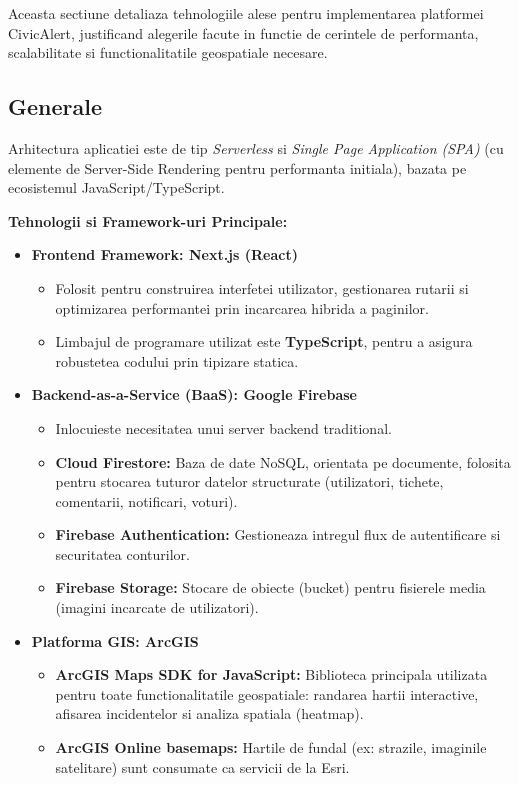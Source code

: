 \documentclass[12pt, a4paper]{article}
\begin{document}
Aceasta sectiune detaliaza tehnologiile alese  pentru implementarea platformei CivicAlert, justificand alegerile facute in functie de cerintele de performanta, scalabilitate si functionalitatile geospatiale necesare.

\subsection{Generale}
Arhitectura aplicatiei este de tip \textit{Serverless} si \textit{Single Page Application (SPA)} (cu elemente de Server-Side Rendering pentru performanta initiala), bazata pe ecosistemul JavaScript/TypeScript.

\textbf{Tehnologii si Framework-uri Principale:}
\begin{itemize}
    \item \textbf{Frontend Framework: Next.js (React)}
        \begin{itemize}
            \item Folosit pentru construirea interfetei utilizator, gestionarea rutarii si optimizarea performantei prin incarcarea hibrida a paginilor.
            \item Limbajul de programare utilizat este \textbf{TypeScript}, pentru a asigura robustetea codului prin tipizare statica.
        \end{itemize}
    \item \textbf{Backend-as-a-Service (BaaS): Google Firebase}
        \begin{itemize}
            \item Inlocuieste necesitatea unui server backend traditional.
            \item \textbf{Cloud Firestore:} Baza de date NoSQL, orientata pe documente, folosita pentru stocarea tuturor datelor structurate (utilizatori, tichete, comentarii, notificari, voturi).
            \item \textbf{Firebase Authentication:} Gestioneaza intregul flux de autentificare si securitatea conturilor.
            \item \textbf{Firebase Storage:} Stocare de obiecte (bucket) pentru fisierele media (imagini incarcate de utilizatori).
        \end{itemize}
    \item \textbf{Platforma GIS: ArcGIS}
        \begin{itemize}
            \item \textbf{ArcGIS Maps SDK for JavaScript:} Biblioteca principala utilizata pentru toate functionalitatile geospatiale: randarea hartii interactive, afisarea incidentelor si analiza spatiala (heatmap).
            \item \textbf{ArcGIS Online basemaps:} Hartile de fundal (ex: strazile, imaginile satelitare) sunt consumate ca servicii de la Esri.
        \end{itemize}
\end{itemize}
\end{document}
